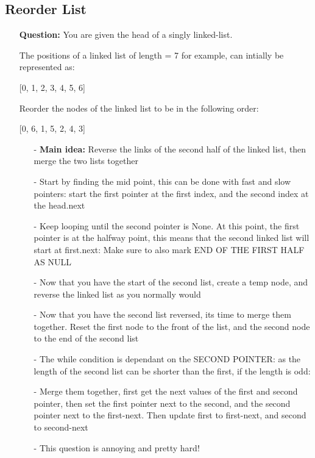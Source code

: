 \documentclass[12pt]{article}
\begin{document}
\subsection{Reorder List}
\begin{enumerate}
  \item[] \textbf{Question:} You are given the head of a singly linked-list.

The positions of a linked list of length = 7 for example, can intially be represented as:

[0, 1, 2, 3, 4, 5, 6]

Reorder the nodes of the linked list to be in the following order:

[0, 6, 1, 5, 2, 4, 3]


    \begin{enumerate}
      \item[-] \textbf{Main idea:} Reverse the links of the second half of the linked list, then merge the two lists together
      \item[-] Start by finding the mid point, this can be done with fast and slow pointers: start the first pointer at the first index, and the second index at the head.next
      \item[-] Keep looping until the second pointer is None. At this point, the first pointer is at the halfway point, this means that the second linked list will start at first.next: Make sure to also mark END OF THE FIRST HALF AS NULL
      \item[-] Now that you have the start of the second list, create a temp node, and reverse the linked list as you normally would
      \item[-] Now that you have the second list reversed, its time to merge them together. Reset the first node to the front of the list, and the second node to the end of the second list
      \item[-] The while condition is dependant on the SECOND POINTER: as the length of the second list can be shorter than the first, if the length is odd: 
      \item[-] Merge them together, first get the next values of the first and second pointer, then set the first pointer next to the second, and the second pointer next to the first-next. Then update first to first-next, and second to second-next
      \item[-] This question is annoying and pretty hard!

    \end{enumerate}
\end{enumerate}
\end{document}
